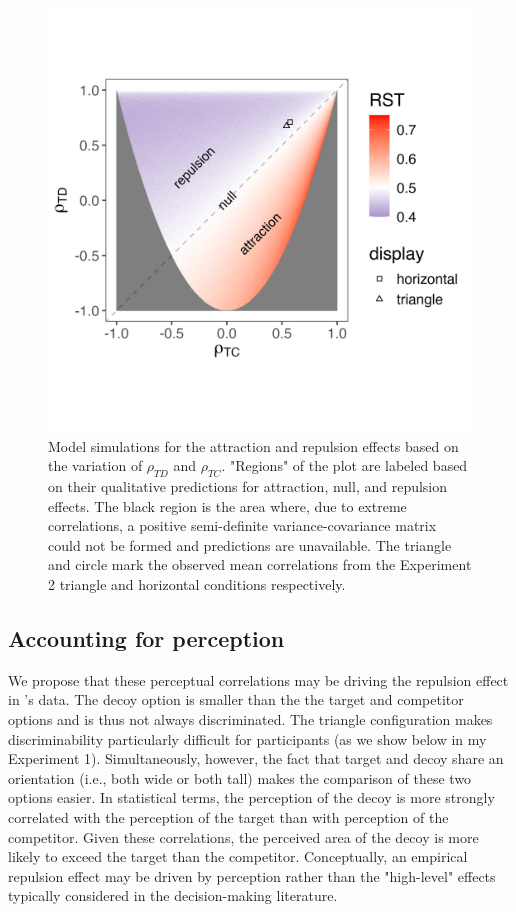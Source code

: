 \documentclass{umassthesis}          %
\begin{document}
\begin{figure}
   \includegraphics[width=\linewidth]{figures/3d_sim_rst.jpg}
   \caption{Model simulations for the attraction and repulsion effects based on the variation of $\rho_{TD}$ and $\rho_{TC}$. "Regions" of the plot are labeled based on their qualitative predictions for attraction, null, and repulsion effects. The black region is the area where, due to extreme correlations, a positive semi-definite variance-covariance matrix could not be formed and predictions are unavailable. The triangle and circle mark the observed mean correlations from the Experiment 2 triangle and horizontal conditions respectively.}
   \label{fig:3d_model}
\end{figure}

\subsection{Accounting for perception}
We propose that these perceptual correlations may be driving the repulsion effect in \textcite{spektorWhenGoodLooks2018b}'s data. The decoy option is smaller than the the target and competitor options and is thus not always discriminated. The triangle configuration makes discriminability particularly difficult for participants (as we show below in my Experiment 1). Simultaneously, however, the fact that target and decoy share an orientation (i.e., both wide or both tall) makes the comparison of these two options easier. In statistical terms, the perception of the decoy is more strongly correlated with the perception of the target than with perception of the competitor. Given these correlations, the perceived area of the decoy is more likely to exceed the target than the competitor. Conceptually, an empirical repulsion effect may be driven by perception rather than the "high-level" effects typically considered in the decision-making literature.
\end{document}
